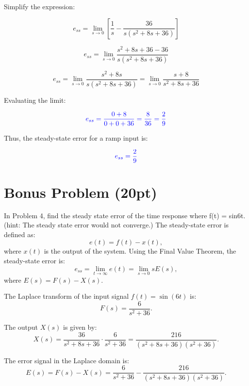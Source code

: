\documentclass{article}
\begin{document}
Simplify the expression:

\[
	e_{ss} = \lim_{s \to 0} \left[ \frac{1}{s} - \frac{36}{s (s^2 + 8s + 36)} \right]
\]

\[
	e_{ss} = \lim_{s \to 0} \frac{s^2 + 8s + 36 - 36}{s (s^2 + 8s + 36)}
\]

\[
	e_{ss} = \lim_{s \to 0} \frac{s^2 + 8s}{s (s^2 + 8s + 36)} = \lim_{s \to 0} \frac{s + 8}{s^2 + 8s + 36}
\]

Evaluating the limit:

\[
	\textcolor{blue}{e_{ss} = \frac{0 + 8}{0 + 0 + 36} = \frac{8}{36} = \frac{2}{9}}
\]

Thus, the steady-state error for a ramp input is:

\[
	\textcolor{blue}{e_{ss} = \frac{2}{9}}
\]

\newpage

\section*{Bonus Problem (20pt)}
In Problem 4, find the steady state error of the time response where f(t) = sin6t. (hint: The steady state error would not converge.)
\newline\newline
The steady-state error is defined as:
\begin{equation}
	e(t) = f(t) - x(t),
\end{equation}
where \( x(t) \) is the output of the system. Using the Final Value Theorem, the steady-state error is:
\begin{equation}
	e_{ss} = \lim_{t \to \infty} e(t) = \lim_{s \to 0} s E(s),
\end{equation}
where \( E(s) = F(s) - X(s) \).

The Laplace transform of the input signal \( f(t) = \sin(6t) \) is:
\begin{equation}
	F(s) = \frac{6}{s^2 + 36}.
\end{equation}

The output \( X(s) \) is given by:
\begin{equation}
	X(s) = \frac{36}{s^2 + 8s + 36} \cdot \frac{6}{s^2 + 36} = \frac{216}{(s^2 + 8s + 36)(s^2 + 36)}.
\end{equation}

The error signal in the Laplace domain is:
\begin{equation}
	E(s) = F(s) - X(s) = \frac{6}{s^2 + 36} - \frac{216}{(s^2 + 8s + 36)(s^2 + 36)}.
\end{equation}
\end{document}
